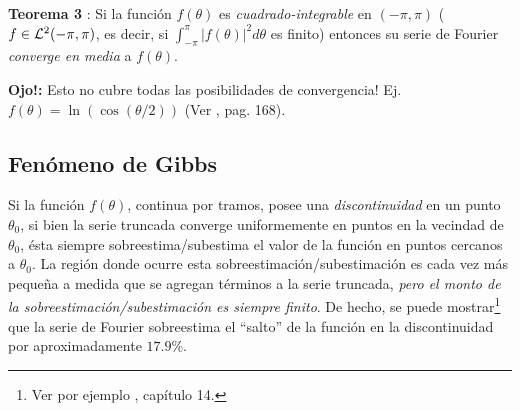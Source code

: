 \textbf{Teorema 3} \cite{Butkov}: Si la función $f(\theta)$ es \textit{cuadrado-integrable} en $(-\pi,\pi)$ ($f\in {\cal L}^2(-\pi,\pi)$, es decir, si $\int_{-\pi}^\pi|f(\theta)|^2d\theta$ es finito) entonces su serie de Fourier \textit{converge en media} a $f(\theta)$.

\textbf{Ojo!:} Esto no cubre todas las posibilidades de convergencia! Ej. $f(\theta)=\ln(\cos(\theta/2))$ (Ver \cite{Butkov}, pag.  168).

\subsection{Fenómeno de Gibbs}

Si la función $f(\theta)$, continua por tramos, posee una \textit{discontinuidad} en un punto $\theta_0$, si bien la serie truncada converge uniformemente en puntos en la vecindad de $\theta_0$, ésta siempre sobreestima/subestima el valor de la función en puntos cercanos a $\theta_0$. La región donde ocurre esta sobreestimación/subestimación es cada vez más pequeña a medida que se agregan términos a la serie truncada, \textit{pero el monto de la sobreestimación/subestimación es siempre finito}. De hecho, se puede mostrar\footnote{Ver por ejemplo \cite{Arfken}, capítulo 14.} que la serie de Fourier sobreestima el ``salto'' de la función en la discontinuidad por aproximadamente $17.9\%$.

